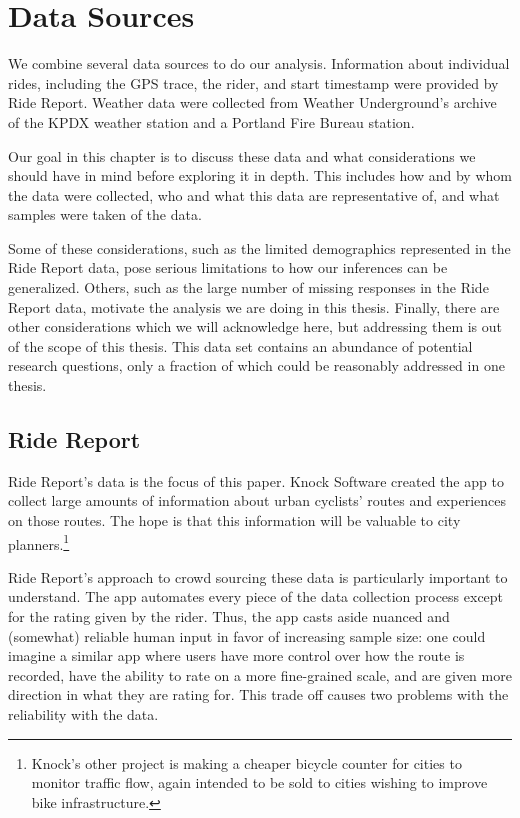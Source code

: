 \documentclass[12pt,twoside]{reedthesis}
\begin{document}
  \chapter{Data Sources}\label{data-sources}
  
  We combine several data sources to do our analysis. Information about
  individual rides, including the GPS trace, the rider, and start
  timestamp were provided by Ride Report. Weather data were collected from
  Weather Underground's archive of the KPDX weather station and a Portland
  Fire Bureau station.
  
  Our goal in this chapter is to discuss these data and what
  considerations we should have in mind before exploring it in depth. This
  includes how and by whom the data were collected, who and what this data
  are representative of, and what samples were taken of the data.
  
  Some of these considerations, such as the limited demographics
  represented in the Ride Report data, pose serious limitations to how our
  inferences can be generalized. Others, such as the large number of
  missing responses in the Ride Report data, motivate the analysis we are
  doing in this thesis. Finally, there are other considerations which we
  will acknowledge here, but addressing them is out of the scope of this
  thesis. This data set contains an abundance of potential research
  questions, only a fraction of which could be reasonably addressed in one
  thesis.
  
  \section{Ride Report}\label{ride-report}
  
  Ride Report's data is the focus of this paper. Knock Software created
  the app to collect large amounts of information about urban cyclists'
  routes and experiences on those routes. The hope is that this
  information will be valuable to city planners.\footnote{Knock's other
    project is making a cheaper bicycle counter for cities to monitor
    traffic flow, again intended to be sold to cities wishing to improve
    bike infrastructure.}
  
  Ride Report's approach to crowd sourcing these data is particularly
  important to understand. The app automates every piece of the data
  collection process except for the rating given by the rider. Thus, the
  app casts aside nuanced and (somewhat) reliable human input in favor of
  increasing sample size: one could imagine a similar app where users have
  more control over how the route is recorded, have the ability to rate on
  a more fine-grained scale, and are given more direction in what they are
  rating for. This trade off causes two problems with the reliability with
  the data.
  
\end{document}
